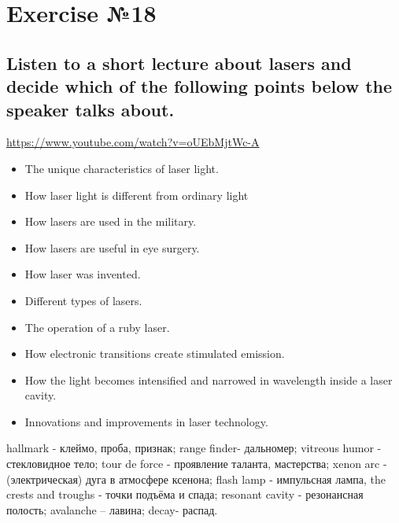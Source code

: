 \section{Exercise №18}
\subsection*{Listen to a short lecture about lasers and decide which of the following points below the
      speaker talks about.}

\href{https://www.youtube.com/watch?v=oUEbMjtWc-A}{https://www.youtube.com/watch?v=oUEbMjtWc-A}

\begin{itemize}
      \item The unique characteristics of laser light.
      \item How laser light is different from ordinary light
      \item How lasers are used in the military.
      \item How lasers are useful in eye surgery.
      \item How laser was invented.
      \item Different types of lasers.
      \item The operation of a ruby laser.
      \item How electronic transitions create stimulated emission.
      \item How the light becomes intensified and narrowed in wavelength inside a laser cavity.
      \item Innovations and improvements in laser technology.
\end{itemize}

 hallmark - клеймо, проба, признак; range finder- дальномер; vitreous humor -
стекловидное тело; tour de force - проявление таланта, мастерства; xenon arc -
(электрическая) дуга в атмосфере ксенона; flash lamp - импульсная лампа, the crests and
troughs - точки подъёма и спада; resonant cavity - резонансная полость; avalanche – лавина;
decay- распад.

